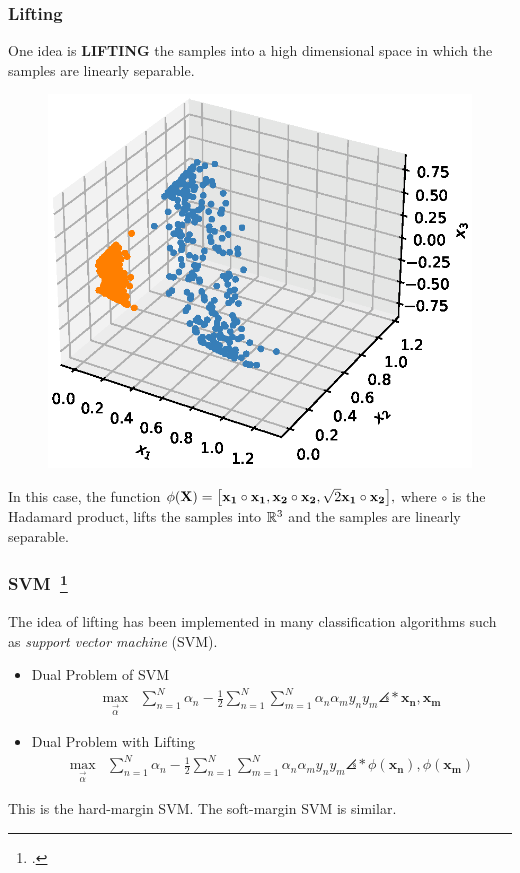 \documentclass[10pt]{../formats/RU}
\begin{document}
\begin{frame}
  \frametitle{Lifting}
  One idea is \textbf{LIFTING} the samples into a high dimensional space in which the samples are linearly separable.
  \begin{figure}
    \includegraphics[height=0.45\textheight]{./figs/3d_poly_circle.eps}%
  \end{figure}
  In this case, the function
  $
  \phi(\mathbf{X}) = \bracks*{\vec{x_1}\circ\vec{x_1} , \vec{x_2}\circ\vec{x_2} , \sqrt{2}\vec{x_1}\circ\vec{x_2}},
  $
  where $\circ$ is the Hadamard product, lifts the samples into $\mathbb{R}^3$ and the samples are linearly separable.
\end{frame}
\begin{frame}
  \frametitle{SVM~\footcite{boyd2004convex}}
  The idea of lifting has been implemented in many classification algorithms such as \emph{support vector machine} (SVM).
  \begin{itemize}
    \item Dual Problem of SVM{
      \begin{align*}
        \max_{\vec{\alpha}} &\sum_{n=1}^N\alpha_n - \frac{1}{2}\sum_{n=1}^{N}\sum_{m=1}^{N}\alpha_n\alpha_m y_ny_m\angles*{\mathbf{x_n}, \mathbf{x_m}}
      \end{align*}
    }
    \item Dual Problem with Lifting {
      \begin{align*}
        \max_{\vec{\alpha}} &\sum_{n=1}^N\alpha_n - \frac{1}{2}\sum_{n=1}^{N}\sum_{m=1}^{N}\alpha_n\alpha_m y_ny_m\angles*{\phi(\mathbf{x_n}), \phi(\mathbf{x_m})}
      \end{align*}
    }
  \end{itemize}
  This is the hard-margin SVM. The soft-margin SVM is similar.
\end{frame}
\end{document}
